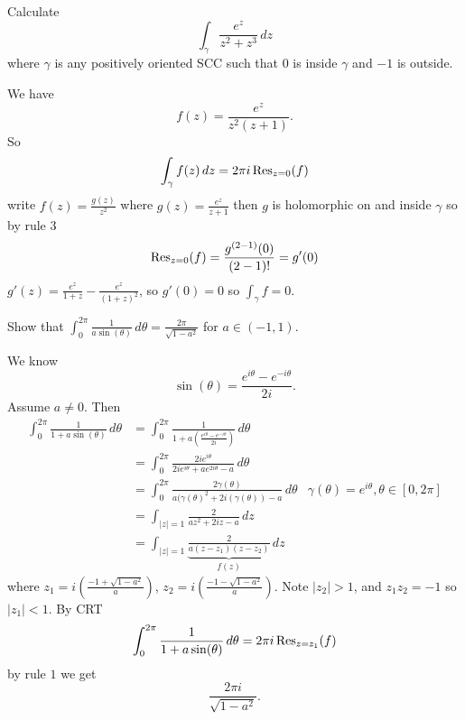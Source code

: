 \documentclass[10pt, a4paper]{article}
\begin{document}
\begin{example}
    Calculate
    \[
    \int_{\gamma}\frac{e ^ z}{z ^ 2 + z ^ 3}\,dz
    \]
    where $\gamma$ is any positively oriented SCC such that $0$ is inside $\gamma$ and $-1$ is outside.

    \begin{solution}
        We have
        \[
        f(z) = \frac{e ^ z}{z ^ 2(z + 1)}.
        \]
        So
        \[
        \int_{\gamma}f(z)\,dz = 2\pi i\operatorname{Res}_{z = 0}(f)
        \]
        write $f(z) = \frac{g(z)}{z ^ 2}$ where $g(z) = \frac{e ^ z}{z + 1}$ then $g$ is holomorphic on and inside $\gamma$ so by rule $3$
        \[
        \operatorname{Res}_{z = 0}(f) = \frac{g ^ {(2 - 1)}(0)}{(2 - 1)!} = g'(0)
        \]
        $g'(z) = \frac{e ^ z}{1 + z} - \frac{e ^ z}{(1 + z) ^ 2}$,
        so $g'(0) = 0$ so $\int_{\gamma}f = 0$.
    \end{solution}
\end{example}

\begin{example}
    Show that $\displaystyle\int_{0}^{2\pi}\frac{1}{a\sin(\theta)}\,d\theta = \frac{2\pi}{\sqrt{1 - a ^ 2}}$ for $a \in (-1, 1)$.

    \begin{solution}
        We know
        \[
        \sin(\theta) = \frac{e ^ {i\theta} - e ^ {-i\theta}}{2i}.
        \]
        Assume $a \neq 0$.
        Then
        \begin{align*}
            \int_{0}^{2\pi}\frac{1}{1 + a\sin(\theta)}\,d\theta &= \int_{0}^{2\pi}\frac{1}{1 + a\left(\frac{e ^ {i\theta} - e ^ {-i\theta}}{2i}\right)}\,d\theta \\
            &= \int_{0}^{2\pi}\frac{2ie ^ {i\theta}}{2ie ^ {i\theta} + ae ^ {2i\theta} - a}\,d\theta \\
            &= \int_{0}^{2\pi}\frac{2\gamma(\theta)}{a(\gamma(\theta) ^ 2 + 2i(\gamma(\theta)) - a}\,d\theta &\gamma(\theta) = e ^ {i\theta}, \theta \in [0, 2\pi] \\
            &= \int_{|z| = 1}\frac{2}{az ^ 2 + 2iz - a}\,dz \\
            &= \int_{|z| = 1}\underbrace{\frac{2}{a(z - z_1)(z - z_2)}}_{f(z)}\,dz
        \end{align*}
        where $z_1 = i\left(\frac{-1 + \sqrt{1 - a ^ 2}}{a}\right)$,
        $z_2 = i\left(\frac{-1 - \sqrt{1 - a ^ 2}}{a}\right)$.
        Note $|z_2| > 1$,
        and $z_1z_2 = -1$ so $|z_1| < 1$.
        By CRT
        \[
        \int_{0}^{2\pi}\frac{1}{1 + a\sin(\theta)}\,d\theta = 2\pi i\operatorname{Res}_{z = z_1}(f)
        \]
        by rule $1$ we get
        \[
        \frac{2\pi i}{\sqrt{1 - a ^ 2}}.
        \]
    \end{solution}
\end{example}
\end{document}
